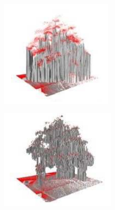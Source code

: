 \begin{figure}[H]
\begin{subfigure}[H]{0.4\linewidth}
        \includegraphics[width=\linewidth]{assets/2_5_b.png}
        \caption{{}}
        \label{fig:2.5b}
    \end{subfigure}
    \hfill
    \begin{subfigure}[H]{0.4\linewidth}
        \centering
        \includegraphics[width=\linewidth]{assets/2_5_c.png}
        \caption{{}}
        \label{fig:2.5c}

\end{subfigure}
\end{figure}
